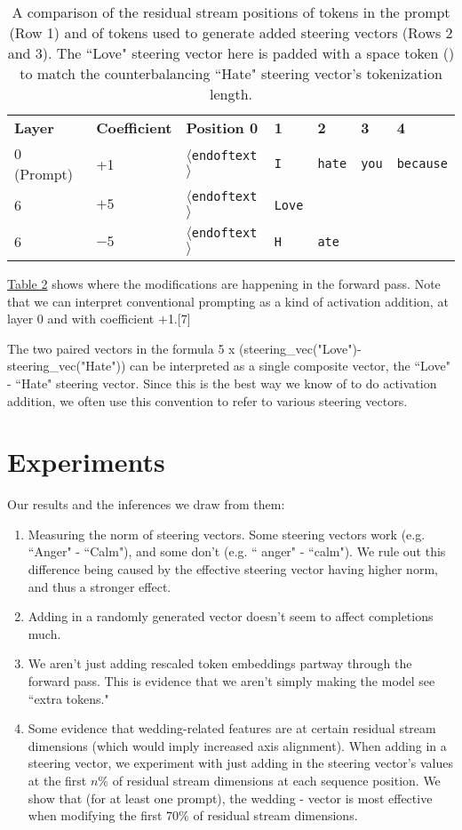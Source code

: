 \documentclass[10pt]{article}
\newcommand{\eot}{$\langle$\textbar endoftext\textbar$\rangle$}
\begin{document}
\begin{table*}[h]
\centering
\vskip 0.1in
\caption{A comparison of the residual stream positions of tokens in the prompt (Row 1) and of tokens used to generate added steering vectors (Rows 2 and 3). The ``Love" steering vector here is padded with a space token (\textvisiblespace) to match the counterbalancing ``Hate" steering vector's tokenization length.}
\vskip 0.1in
	\begin{tabularx}{\linewidth}{XXXXXXX}
	\rowcolor{gray!20} \textbf{Layer}&\textbf{Coefficient}&\textbf{Position 0}&\textbf{1}&\textbf{2}&\textbf{3}&\textbf{4}\\
	0 (Prompt)&+1&\texttt{\eot}&\texttt{I}&\textvisiblespace \texttt{hate}&\textvisiblespace \texttt{you}&\textvisiblespace \texttt{because}\\
	6&$+5$&\texttt{\eot}&\texttt{Love}&\textvisiblespace&&\\
	6&$-5$&\texttt{\eot}&\texttt{H}&\texttt{ate}&&
	\end{tabularx}
\label{tab:table2}
\end{table*}


\hyperref[tab:table2]{Table 2} shows where the modifications are happening in the forward pass. Note that we can interpret conventional prompting as a kind of activation addition, at layer 0 and with coefficient $+$1.[7]

The two paired vectors in the formula 5 x (steering\_vec("Love")-steering\_vec("Hate")) can be interpreted as a single composite vector, the ``Love" - ``Hate" steering vector. Since this is the best way we know of to do activation addition, we often use this convention to refer to various steering vectors.


\section{Experiments}
Our results and the inferences we draw from them:

\begin{enumerate}
\item Measuring the norm of steering vectors. Some steering vectors work (e.g. ``Anger" - ``Calm"), and some don't (e.g. `` anger" - ``calm"). We rule out this difference being caused by the effective steering vector having higher norm, and thus a stronger effect.
\item Adding in a randomly generated vector doesn't seem to affect completions much.
\item We aren't just adding rescaled token embeddings partway through the forward pass. This is evidence that we aren't simply making the model see ``extra tokens."
\item Some evidence that wedding-related features are at certain residual stream dimensions (which would imply increased axis alignment). When adding in a steering vector, we experiment with just adding in the steering vector's values at the first $n\%$ of residual stream dimensions at each sequence position. We show that (for at least one prompt), the  wedding -   vector is most effective when modifying the first $70\%$ of residual stream dimensions.
\end{enumerate}
\end{document}
